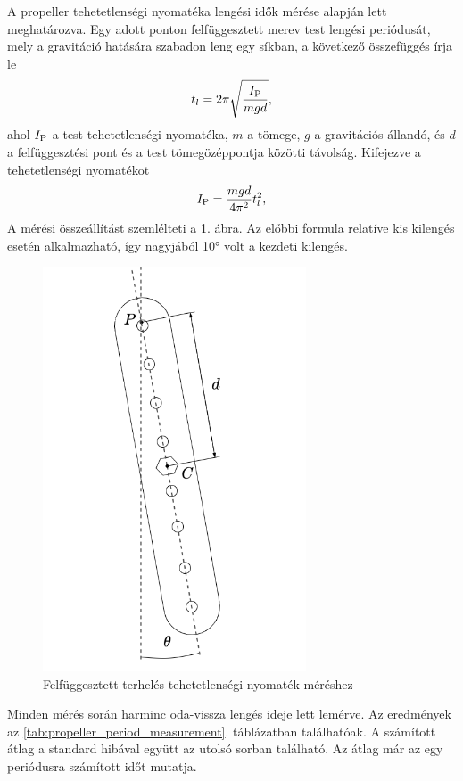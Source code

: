A propeller tehetetlenségi nyomatéka lengési idők mérése alapján lett meghatározva. Egy 
adott ponton felfüggesztett merev test lengési periódusát, mely a gravitáció hatására 
szabadon leng egy síkban, a következő összefüggés írja le
\begin{equation}
    t_l = 2\pi\sqrt{\frac{I_{\mathrm{P}}}{mgd}},
\end{equation}
ahol \(I_{\mathrm{P}}\) a test tehetetlenségi nyomatéka, \(m\) a tömege, \(g\) a gravitációs állandó, 
és \(d\) a felfüggesztési pont és a test tömegözéppontja közötti távolság. 
Kifejezve a tehetetlenségi nyomatékot 
\begin{equation}
    I_{\mathrm{P}} = \frac{mgd}{4\pi^2}t^2_l,
\end{equation}
A mérési összeállítást szemlélteti a \ref{fig:propeller_pendulum}. ábra. Az 
előbbi formula relatíve kis kilengés esetén alkalmazható, így nagyjából 
10° volt a kezdeti kilengés.

\begin{figure}[b!]
    \begin{center}
    \includegraphics[height=12cm]{images/impedance_control_propeller.png}
    \caption{Felfüggesztett terhelés tehetetlenségi nyomaték méréshez}\label{fig:propeller_pendulum}
    \end{center}
\end{figure}

Minden mérés során harminc oda-vissza 
lengés ideje lett lemérve. Az eredmények az \ref{tab:propeller_period_measurement}. táblázatban találhatóak. A számított 
átlag a standard hibával együtt az utolsó sorban található. Az átlag már az egy periódusra számított 
időt mutatja.

